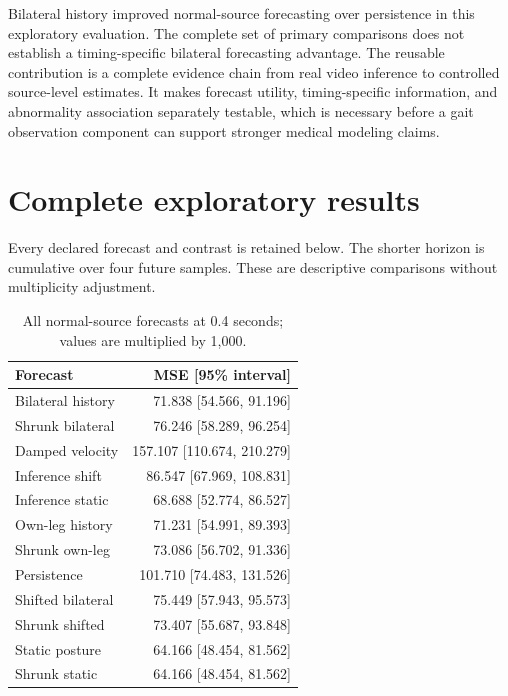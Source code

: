 \documentclass[letterpaper]{article}
\begin{document}
Bilateral history improved normal-source forecasting over persistence in this exploratory evaluation. The complete set of primary comparisons does not establish a timing-specific bilateral forecasting advantage. The reusable contribution is a complete evidence chain from real video inference to controlled source-level estimates. It makes forecast utility, timing-specific information, and abnormality association separately testable, which is necessary before a gait observation component can support stronger medical modeling claims.



\clearpage

\appendix

\section{Complete exploratory results}

Every declared forecast and contrast is retained below. The shorter horizon is cumulative over four future samples. These are descriptive comparisons without multiplicity adjustment.

\begin{table}[t]
\centering
\small
\begin{tabular}{lr}
\toprule
Forecast & MSE [95\% interval] \\
\midrule
Bilateral history & 71.838 [54.566, 91.196] \\
Shrunk bilateral & 76.246 [58.289, 96.254] \\
Damped velocity & 157.107 [110.674, 210.279] \\
Inference shift & 86.547 [67.969, 108.831] \\
Inference static & 68.688 [52.774, 86.527] \\
Own-leg history & 71.231 [54.991, 89.393] \\
Shrunk own-leg & 73.086 [56.702, 91.336] \\
Persistence & 101.710 [74.483, 131.526] \\
Shifted bilateral & 75.449 [57.943, 95.573] \\
Shrunk shifted & 73.407 [55.687, 93.848] \\
Static posture & 64.166 [48.454, 81.562] \\
Shrunk static & 64.166 [48.454, 81.562] \\
\bottomrule
\end{tabular}
\caption{All normal-source forecasts at 0.4 seconds; values are multiplied by 1,000.}
\end{table}
\end{document}
